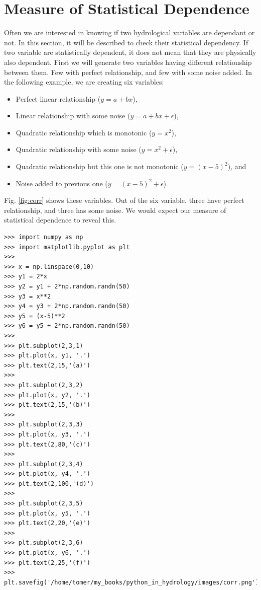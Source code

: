 \documentclass[10pt]{book}
\begin{document}
{\section{Measure of Statistical Dependence}

Often we are interested in knowing if two hydrological variables are dependant or not. In this section, it will be described to check their statistical dependency. If two variable are statistically dependent, it does not mean that they are physically also dependent. First we will generate two variables having different relationship between them. Few with perfect relationship, and few with some noise added. In the following example, we are creating six variables: 
\begin{itemize}
\item Perfect linear relationship ($y = a +bx$),
\item Linear relationship with some noise ($y = a +bx + \epsilon $),
\item Quadratic relationship which is monotonic ($y = x^2 $),
\item Quadratic relationship with some noise ($y = x^2 + \epsilon $),
\item Quadratic relationship but this one is not monotonic ($y = (x-5)^2 $), and
\item Noise added to previous one ($y = (x-5)^2 + \epsilon $).
\end{itemize}
Fig. \ref{fig:corr} shows these variables. Out of the six variable, three have perfect relationship, and three has some noise. We would expect our measure of statistical dependence to reveal this. 
\beforeverb \begin{verbatim}
>>> import numpy as np
>>> import matplotlib.pyplot as plt
>>> 
>>> x = np.linspace(0,10)
>>> y1 = 2*x 
>>> y2 = y1 + 2*np.random.randn(50)
>>> y3 = x**2
>>> y4 = y3 + 2*np.random.randn(50)
>>> y5 = (x-5)**2
>>> y6 = y5 + 2*np.random.randn(50)
>>> 
>>> plt.subplot(2,3,1)
>>> plt.plot(x, y1, '.')
>>> plt.text(2,15,'(a)')
>>> 
>>> plt.subplot(2,3,2)
>>> plt.plot(x, y2, '.')
>>> plt.text(2,15,'(b)')
>>> 
>>> plt.subplot(2,3,3)
>>> plt.plot(x, y3, '.')
>>> plt.text(2,80,'(c)')
>>> 
>>> plt.subplot(2,3,4)
>>> plt.plot(x, y4, '.')
>>> plt.text(2,100,'(d)')
>>> 
>>> plt.subplot(2,3,5)
>>> plt.plot(x, y5, '.')
>>> plt.text(2,20,'(e)')
>>> 
>>> plt.subplot(2,3,6)
>>> plt.plot(x, y6, '.')
>>> plt.text(2,25,'(f)')
>>> plt.savefig('/home/tomer/my_books/python_in_hydrology/images/corr.png')
\end{verbatim} \afterverb

}
\end{document}
